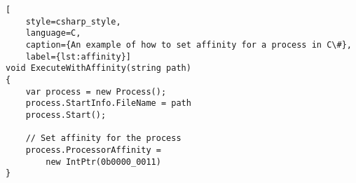 \begin{lstlisting}[
    style=csharp_style,
    language=C, 
    caption={An example of how to set affinity for a process in C\#},
    label={lst:affinity}]
void ExecuteWithAffinity(string path)
{
    var process = new Process();
    process.StartInfo.FileName = path
    process.Start();
    
    // Set affinity for the process
    process.ProcessorAffinity = 
        new IntPtr(0b0000_0011)
}
  \end{lstlisting}